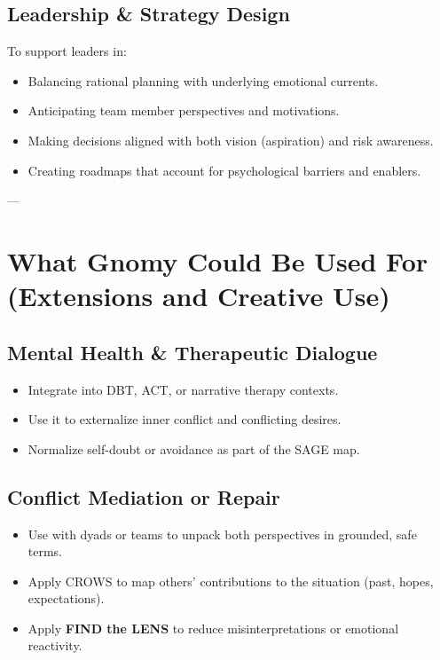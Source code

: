 \documentclass{article}
\begin{document}
\subsection{Leadership \& Strategy Design}
To support leaders in:
\begin{itemize}[noitemsep,topsep=0pt]
    \item Balancing rational planning with underlying emotional currents.
    \item Anticipating team member perspectives and motivations.
    \item Making decisions aligned with both vision (aspiration) and risk awareness.
    \item Creating roadmaps that account for psychological barriers and enablers.
\end{itemize}

---

\section{What Gnomy Could Be Used For (Extensions and Creative Use)}

\subsection{Mental Health \& Therapeutic Dialogue}
\begin{itemize}[noitemsep,topsep=0pt]
    \item Integrate into DBT, ACT, or narrative therapy contexts.
    \item Use it to externalize inner conflict and conflicting desires.
    \item Normalize self-doubt or avoidance as part of the SAGE map.
\end{itemize}

\subsection{Conflict Mediation or Repair}
\begin{itemize}[noitemsep,topsep=0pt]
    \item Use with dyads or teams to unpack both perspectives in grounded, safe terms.
    \item Apply CROWS to map others' contributions to the situation (past, hopes, expectations).
    \item Apply \textbf{FIND the LENS} to reduce misinterpretations or emotional reactivity.
\end{itemize}
\end{document}

